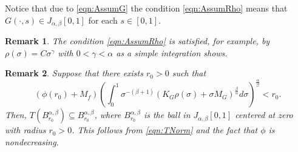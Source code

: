 \documentclass[12pt,a4paper]{article}
\newtheorem{rem}{Remark}
\begin{document}
Notice that due to \eqref{eqn:AssumG} the condition \eqref{eqn:AssumRho} means that $G(\cdot, s) \in J_{\alpha,\beta}[0,1]$ for each $s\in [0,1]$.
\begin{rem}
	The condition \eqref{eqn:AssumRho} is satisfied, for example, by $\rho(\sigma) = C\sigma^\gamma$ with $0<\gamma < \alpha$ as a simple integration shows. 
\end{rem}
\begin{rem}\label{rem:R0}
	Suppose that there exists $r_0 > 0$ such that
	\begin{equation}\label{eqn:AssumR0}
		\left(\phi(r_0) + M_f\right)  \left(\int_0^1 \sigma^{-(\beta+1)} \left(K_G\rho(\sigma) + \sigma M_G \right)^\frac{\beta}{\alpha} d\sigma\right)^\frac{\alpha}{\beta} < r_0.
	\end{equation}
	Then, $T(B_{r_0}^{\alpha,\beta}) \subseteq B_{r_0}^{\alpha,\beta}$, where $B_{r_0}^{\alpha,\beta}$ is the ball in $J_{\alpha,\beta}[0,1]$ centered at zero with radius $r_0 >0$. This follows from \eqref{eqn:TNorm} and the fact that $\phi$ is nondecreasing. 
\end{rem}
\end{document}
